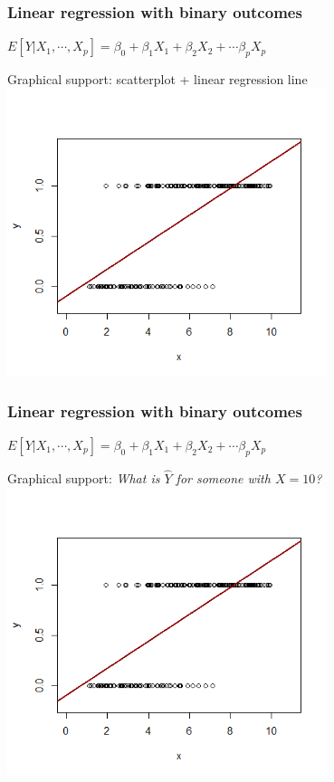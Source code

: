 \documentclass[12pt, 
hyperref={colorlinks=true, linkcolor=blue, urlcolor=cyan}]{beamer}
\begin{document}
\begin{frame}[noframenumbering]
\frametitle{Linear regression with binary outcomes}
\begin{center} $E[Y|X_1,\cdots,X_p] = \beta_0 + \beta_1 X_1 + \beta_2 X_2 + \cdots \beta_p X_p$ \end{center}

\color{blue} Graphical support: \color{black} scatterplot + linear regression line
\vspace{-0.55cm}
\center
\includegraphics[width=0.7\textwidth]{./figs/scatterplot_lm}
\end{frame}

\begin{frame}[noframenumbering]
\frametitle{Linear regression with binary outcomes}
\begin{center} $E[Y|X_1,\cdots,X_p] = \beta_0 + \beta_1 X_1 + \beta_2 X_2 + \cdots \beta_p X_p$ \end{center}

\color{blue} Graphical support: \color{black} \textit{What is $\hat{Y}$ for someone with $X = 10$?}
\vspace{-0.55cm}
\center
\includegraphics[width=0.7\textwidth]{./figs/scatterplot_lm}
\end{frame}
\end{document}

